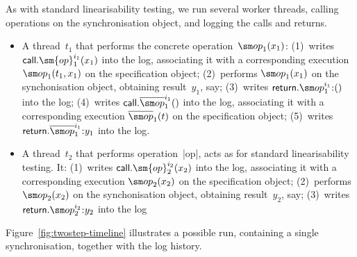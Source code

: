 As with standard linearisability testing, we run several worker threads,
calling operations on the synchronisation object, and logging the calls and
returns.
%
\begin{itemize}
\item A thread~$t_1$ that performs the concrete operation~$\op_1(x_1)$:
  (1)~writes $\call.\sm{op}_1^{i_1}(x_1)$ into the log, associating it with a
  corresponding execution $\op_1(t_1, x_1)$ on the specification object;
  (2)~performs $\op_1(x_1)$ on the synchonisation object, obtaining
  result~$y_1$, say; (3)~writes $\return.\op_1^{i_1} \:: ()$ into the log;
  (4)~writes $\call.\overline{\op}_1^{i_1}()$ into the log, associating it
  with a corresponding execution $\overline{\op}_1(t)$ on the specification
  object; (5)~writes $\return.\overline{\op}_1^{i_1} \:: y_1$ into the log.

\item A thread~$t_2$ that performs operation~|op|, acts as for standard
  linearisability testing.  It: (1)~writes $\call.\sm{op}_2^{i_2}(x_2)$ into
  the log, associating it with a corresponding execution $\op_2(x_2)$ on the
  specification object; (2)~performs $\op_2(x_2)$ on the synchonisation
  object, obtaining result~$y_2$, say; (3)~writes $\return.\op_2^{i_2} \::
  y_2$ into the log
\end{itemize}
%
Figure~\ref{fig:twostep-timeline} illustrates a possible run, containing a
single synchronisation, together with the log history.

